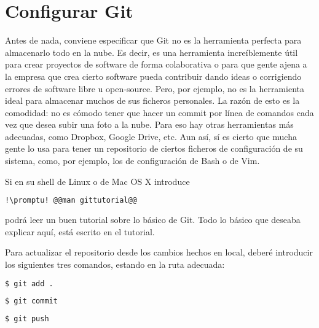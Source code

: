 \section{Configurar Git}\label{sec:git}
Antes de nada, conviene especificar que Git no es la herramienta perfecta para almacenarlo todo en la nube. Es
decir, es una herramienta increíblemente útil para crear proyectos de software de forma colaborativa o para que
gente ajena a la empresa que crea cierto software pueda contribuir dando ideas o corrigiendo errores de software
libre u open-source. Pero, por ejemplo, no es la herramienta ideal para almacenar muchos de sus ficheros
personales. La razón de esto es la comodidad: no es cómodo tener que hacer un commit por línea de comandos cada
vez que desea subir una foto a la nube. Para eso hay otras herramientas más adecuadas, como Dropbox, Google
Drive, etc. Aun así, sí es cierto que mucha gente lo usa para tener un repositorio de ciertos ficheros de
configuración de su sistema, como, por ejemplo, los de configuración de Bash o de Vim.

Si en su shell de Linux o de Mac OS X introduce

\begin{lstlisting}[gobble=2,language=bash,style=bashinteract,escapechar=!]
  !\promptu! @@man gittutorial@@
\end{lstlisting}

\noindent podrá leer un buen tutorial sobre lo básico de Git. Todo lo básico que deseaba explicar aquí, está
escrito en el tutorial.

Para actualizar el repositorio desde los cambios hechos en local, deberé introducir los siguientes tres
comandos, estando en la ruta adecuada:


\begin{lstlisting}[gobble=2,language=bash,style=bashinteract,escapechar=!]
  $ git add .
\end{lstlisting}

\begin{lstlisting}[gobble=2,language=bash,style=bashinteract,escapechar=!]
  $ git commit
\end{lstlisting}

\begin{lstlisting}[gobble=2,language=bash,style=bashinteract,escapechar=!]
  $ git push
\end{lstlisting}
